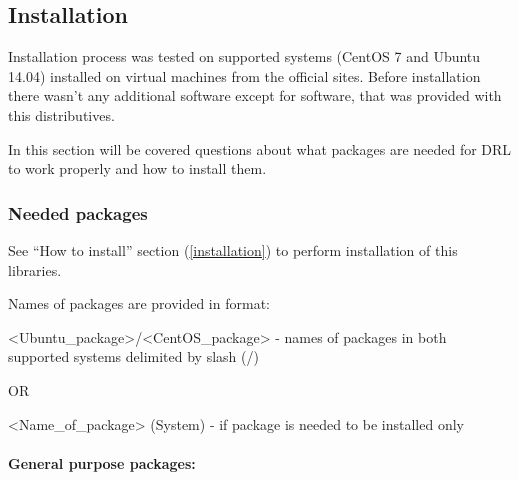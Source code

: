 \documentclass[a4paper,oneside,dvipsnames]{article}
\begin{document}
\subsection[Installation]{Installation}

Installation process was tested on supported systems (CentOS 7 and Ubuntu 14.04) installed on virtual machines from the official sites. Before installation there wasn't any additional software except for software, that was provided with this distributives.

In this section will be covered questions about what packages are needed for DRL to work properly and how to install them.

\subsubsection[Needed packages]{Needed packages}
See ``How to install'' section (\ref{installation}) to perform installation of this libraries.

Names of packages are provided in format: 
\begin{tcolorbox}[colbacktitle=gray!40!white, coltitle=black, width=\linewidth, fonttitle=\bfseries, title=Conventions]
<Ubuntu\_package>/<CentOS\_package> - names of packages in both supported systems delimited by slash (/)
\end{tcolorbox}
OR
\begin{tcolorbox}[colbacktitle=gray!40!white, coltitle=black, width=\linewidth, fonttitle=\bfseries, title=Conventions]
<Name\_of\_package> (System) - if package is needed to be installed only 
\end{tcolorbox}

\paragraph*{General purpose packages:}
\end{document}
